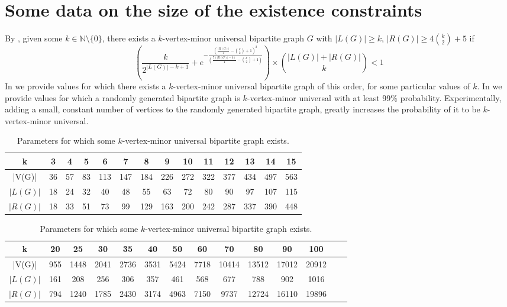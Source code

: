 \documentclass[10pt,a4paper]{article}
\newcommand{\gs}{\geqslant}
\begin{document}
\appendix


\section{Some data on the size of the existence constraints}

By , given some $k\in \mathbb N\setminus\{0\}$, there exists a $k$-vertex-minor universal bipartite graph $G$ with $|L(G)|\gs k$, $|R(G)|\gs4{k \choose 2}+5$ if $$ \left( \frac{k}{2^{|L(G)|-k+1}} + e^{-\frac{\left(\frac{|R(G)|}{4}-{k \choose 2}+1\right)^2}{\left(\frac{7(|R(G)|-k)}{4}-{k \choose 2}+1\right)}}\right)\times {|L(G)|+|R(G)| \choose k} < 1$$
In  we provide values for which there exists a $k$-vertex-minor universal bipartite graph of this order, for some particular values of $k$. In  we provide values for which a randomly generated bipartite graph is $k$-vertex-minor universal with at least 99\% probability. Experimentally, adding a small, constant number of vertices to the randomly generated bipartite graph, greatly increases the probability of it to be $k$-vertex-minor universal.


\label{app:table}

\begin{table}[ht]
    \centering
    \caption{Parameters for which some $k$-vertex-minor universal bipartite graph exists. }
    \begin{tabular}{|c|c|c|c|c|c|c|c|c|c|c|c|c|c|}
        \hline
        k               & 3  & 4  & 5  & 6  & 7  & 8  & 9  & 10  & 11  & 12  & 13  & 14  & 15  \\
        \hline
        |V(G)|  & 36  & 57  & 83  & 113  & 147  & 184  & 226  & 272  & 322  & 377  & 434  & 497  & 563 \\
        \hline
        $|L(G)|$  & 18  & 24  & 32  & 40  & 48  & 55  & 63  & 72  & 80  & 90  & 97  & 107  & 115 \\
        \hline
        $|R(G)|$ & 18  & 33  & 51  & 73  & 99  & 129  & 163  & 200  & 242  & 287  & 337  & 390  & 448 \\
        \hline
    \end{tabular}

    \bigskip

    \begin{tabular}{|c|c|c|c|c|c|c|c|c|c|c|c|c|c|}
        \hline
        k    & 20  & 25  & 30  & 35  & 40  & 50  & 60  & 70  & 80  & 90  & 100 \\
        \hline
        |V(G)|  & 955  & 1448  & 2041  & 2736  & 3531  & 5424  & 7718  & 10414  & 13512  & 17012  & 20912 \\
        \hline
        $|L(G)|$  & 161  & 208  & 256  & 306  & 357  & 461  & 568  & 677  & 788  & 902  & 1016 \\
        \hline
        $|R(G)|$  & 794  & 1240  & 1785  & 2430  & 3174  & 4963  & 7150  & 9737  & 12724  & 16110  & 19896 \\
        \hline
    \end{tabular}

    \label{tab:exists_kvmu}

\end{table}
\end{document}
